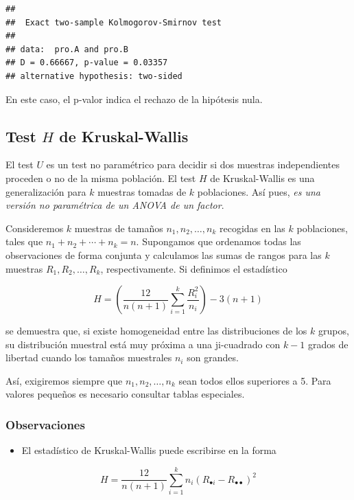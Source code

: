 \documentclass[
]{article}
\providecommand{\tightlist}{%
  \setlength{\itemsep}{0pt}\setlength{\parskip}{0pt}}
\begin{document}
\begin{verbatim}
## 
##  Exact two-sample Kolmogorov-Smirnov test
## 
## data:  pro.A and pro.B
## D = 0.66667, p-value = 0.03357
## alternative hypothesis: two-sided
\end{verbatim}

En este caso, el p-valor indica el rechazo de la hipótesis nula.

\subsection{\texorpdfstring{Test \(H\) de Kruskal-Wallis}{Test H de Kruskal-Wallis}}\label{test-h-de-kruskal-wallis}

El test \(U\) es un test no paramétrico para decidir si dos muestras independientes proceden o no de la misma población. El test \(H\) de Kruskal-Wallis es una generalización para \(k\) muestras tomadas de \(k\) poblaciones. Así pues, \emph{es una versión no paramétrica de un ANOVA de un factor}.

Consideremos \(k\) muestras de tamaños \(n_{1}, n_{2}, \ldots, n_{k}\) recogidas en las \(k\) poblaciones, tales que \(n_{1}+n_{2}+\cdots+n_{k}=n\). Supongamos que ordenamos todas las observaciones de forma conjunta y calculamos las sumas de rangos para las \(k\) muestras \(R_{1}, R_{2}, \ldots, R_{k}\), respectivamente. Si definimos el estadístico

\[
H=\left(\frac{12}{n(n+1)} \sum_{i=1}^{k} \frac{R_{i}^{2}}{n_{i}}\right)-3(n+1)
\]

se demuestra que, si existe homogeneidad entre las distribuciones de los \(k\) grupos, su distribución muestral está muy próxima a una ji-cuadrado con \(k-1\) grados de libertad cuando los tamaños muestrales \(n_{i}\) son grandes.

Así, exigiremos siempre que \(n_{1}, n_{2}, \ldots, n_{k}\) sean todos ellos superiores a 5. Para valores pequeños es necesario consultar tablas especiales.

\subsubsection{Observaciones}\label{observaciones-5}

\begin{itemize}
\tightlist
\item
  El estadístico de Kruskal-Wallis puede escribirse en la forma
\end{itemize}

\[
H=\frac{12}{n(n+1)} \sum_{i=1}^{k} n_{i}\left(R_{\bullet i}-R_{\bullet \bullet}\right)^{2}
\]
\end{document}
